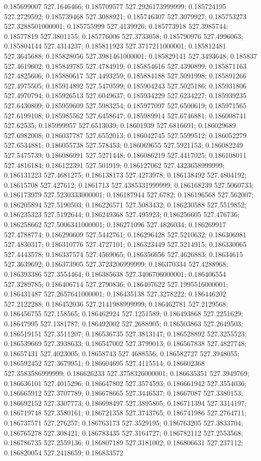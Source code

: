0.185699007 527.1646466; 0.185709577 527.2926173999999; 0.185724195 527.2729592; 0.185739468 527.3088921; 0.185746307 527.3079927; 0.185753273 527.3288501000001; 0.185755999 527.4139926; 0.185773918 527.3985744; 0.18577819 527.3801155; 0.185776006 527.3733058; 0.185790976 527.4996063; 0.185804144 527.4314237; 0.185811923 527.3717211000001; 0.185812481 527.3645688; 0.185828056 527.3981461000001; 0.185829141 527.3493648; 0.185837 527.4619602; 0.185849785 527.4784919; 0.185854616 527.4390899; 0.185871163 527.4825606; 0.185880617 527.4493259; 0.185884188 527.5091998; 0.185891266 527.4975505; 0.185914892 527.5470599; 0.185904243 527.5025186; 0.185931806 527.4970794; 0.185926513 527.6049637; 0.185934229 527.6234227; 0.185939235 527.6430809; 0.185959609 527.5983254; 0.185977097 527.6500619; 0.185971565 527.6199108; 0.185985562 527.6458647; 0.185989914 527.6746881; 0.186008741 527.62535; 0.185999957 527.6513039; 0.18601939 527.6816691; 0.186029689 527.6982008; 0.186037787 527.6552013; 0.186042745 527.5599512; 0.186052279 527.6534881; 0.186055738 527.578453; 0.186069655 527.5921153; 0.186082249 527.5475739; 0.186086091 527.5271448; 0.186086219 527.4417025; 0.186108011 527.4816184; 0.186122391 527.501919; 0.186127062 527.4323658999999; 0.186131223 527.4681275; 0.186138173 527.4273978; 0.186138492 527.4804192; 0.18615708 527.427612; 0.1861713 527.4385331999999; 0.186168239 527.5060733; 0.186173979 527.5230333000001; 0.186187944 527.6782; 0.186196568 527.562007; 0.186205894 527.5190503; 0.186226571 527.5083432; 0.186230588 527.5519852; 0.186235323 527.5192644; 0.186249368 527.495923; 0.186256605 527.476736; 0.186258662 527.5006341000001; 0.186271096 527.4826034; 0.186269917 527.4788774; 0.186290609 527.5442761; 0.186296428 527.5210632; 0.186306981 527.4830317; 0.186310776 527.4727101; 0.186323449 527.5214915; 0.186330065 527.4443578; 0.186337574 527.4569065; 0.186356656 527.4626883; 0.18634615 527.3639692; 0.186373905 527.3723206999999; 0.186370334 527.4288968; 0.186393386 527.3554464; 0.186385638 527.3406706000001; 0.186406554 527.3289785; 0.186406714 527.2790836; 0.186407622 527.1995516000001; 0.186431487 527.2657641000001; 0.186435138 527.3278222; 0.186446202 527.2122288; 0.186452036 527.2141988999999; 0.186462781 527.2129568; 0.186456755 527.158565; 0.186462924 527.1251589; 0.186493868 527.2251629; 0.18647995 527.1381787; 0.186492002 527.2688905; 0.186503863 527.2649503; 0.186519151 527.3511207; 0.186536735 527.3813147; 0.186528892 527.3255523; 0.186539669 527.3938633; 0.186547002 527.3799013; 0.186567838 527.4827748; 0.18657431 527.4023005; 0.18658743 527.4688556; 0.186582727 527.3948055; 0.186592452 527.3679951; 0.186604695 527.4115514; 0.186602368 527.3583586999999; 0.186626233 527.3758326000001; 0.186635351 527.3949769; 0.186636101 527.4015296; 0.186647802 527.3574593; 0.186661942 527.3554036; 0.186665912 527.3707789; 0.186678665 527.3446537; 0.18667087 527.3380153; 0.186692152 527.3307773; 0.186698497 527.3895805; 0.186711394 527.3314197; 0.186719748 527.3580161; 0.186721358 527.3743765; 0.186741986 527.2764711; 0.186737571 527.276257; 0.186763173 527.3529195; 0.186763205 527.3833704; 0.186765278 527.308421; 0.186783435 527.3164727; 0.186782112 527.2553568; 0.186786735 527.2559136; 0.186807189 527.3181002; 0.186806631 527.237112; 0.186820054 527.2418659; 0.186833572 